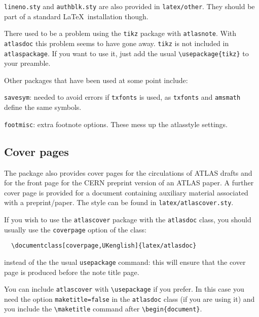 \documentclass[atlasstyle,UKenglish]{latex/atlasdoc}
\newcommand{\File}[1]{\texttt{#1}\xspace}
\newcommand{\Macro}[1]{\texttt{\textbackslash #1}\xspace}
\newcommand{\Option}[1]{\textsf{#1}\xspace}
\newcommand{\Package}[1]{\texttt{#1}\xspace}
\begin{document}
\File{lineno.sty} and \File{authblk.sty} are also provided in \File{latex/other}.
They should be part of a standard \LaTeX\ installation though.

There used to be a problem using the \Package{tikz} package with \Package{atlasnote}.
With \Package{atlasdoc} this problem seems to have gone away.
\Package{tikz} is not included in \Package{atlaspackage}.
If you want to use it, just add the usual \verb|\usepackage{tikz}| to your preamble.

Other packages that have been used at some point include:
\begin{description}\setlength{\parskip}{0pt}\setlength{\itemsep}{0pt}
\item \Package{savesym}: needed to avoid errors if \Package{txfonts} is used, 
  as \Package{txfonts} and \Package{amsmath} define the same symbols.
\item \texttt{footmisc}: extra footnote options. 
  These mess up the \Option{atlasstyle} settings.
\end{description}


\subsection{Cover pages}
\label{sec:cover}

The package also provides cover pages for the circulations of ATLAS drafts and 
for the front page for the CERN preprint version of an ATLAS paper.
A further cover page is provided for a document containing auxiliary material associated with a preprint/paper.
The style can be found in \texttt{latex/atlascover.sty}.

If you wish to use the \texttt{atlascover} package with the 
\texttt{atlasdoc} class, you should usually use the \texttt{coverpage} option of the class:
\begin{verbatim}
  \documentclass[coverpage,UKenglish]{latex/atlasdoc}
\end{verbatim}
instead of the the usual \texttt{usepackage} command: this will ensure
that the cover page is produced before the note title page.

You can include \texttt{atlascover} with \Macro{usepackage} if you prefer.
In this case you need the option \texttt{maketitle=false} in the \texttt{atlasdoc} class
(if you are using it)
and you include the \Macro{maketitle} command after \verb|\begin{document}|.
\end{document}
